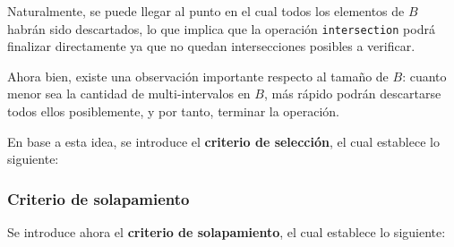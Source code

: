 Naturalmente, se puede llegar al punto en el cual todos los elementos de $B$ habrán sido descartados, lo que implica que la operación \texttt{intersection} podrá finalizar directamente ya que no quedan intersecciones posibles a verificar.

Ahora bien, existe una observación importante respecto al tamaño de $B$: cuanto menor sea la cantidad de multi-intervalos en $B$, más rápido podrán descartarse todos ellos posiblemente, y por tanto, terminar la operación.

En base a esta idea, se introduce el \textbf{criterio de selección}, el cual establece lo siguiente:

\begin{center}
\end{center}

\subsubsection{Criterio de solapamiento}


Se introduce ahora el \textbf{criterio de solapamiento}, el cual establece lo siguiente:


